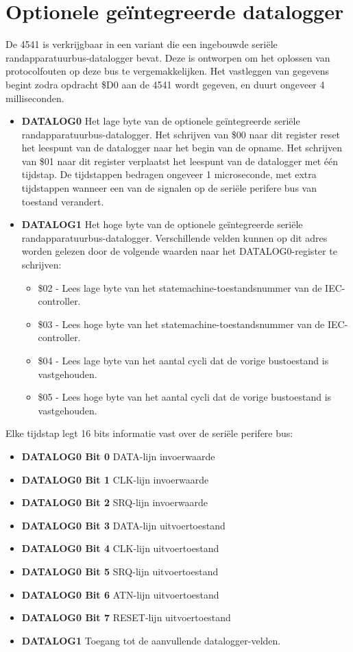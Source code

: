  \section{Optionele geïntegreerde datalogger}

 De 4541 is verkrijgbaar in een variant die een ingebouwde seriële        randapparatuurbus-datalogger bevat. Deze is ontworpen om het oplossen van        protocolfouten op deze bus te vergemakkelijken. Het vastleggen van gegevens begint zodra        opdracht \$D0 aan de 4541 wordt gegeven, en        duurt ongeveer 4 milliseconden.

\begin{itemize}
   \item {\bf DATALOG0} Het lage byte van de optionele geïntegreerde seriële    randapparatuurbus-datalogger. Het schrijven van \$00 naar dit register    reset het leespunt van de datalogger naar het begin van de    opname. Het schrijven van \$01 naar dit register    verplaatst het leespunt van de datalogger met één tijdstap.    De tijdstappen bedragen ongeveer 1 microseconde, met extra        tijdstappen wanneer een van de signalen op de seriële        perifere bus van toestand verandert.    \item {\bf DATALOG1} Het hoge byte van de optionele geïntegreerde seriële      randapparatuurbus-datalogger. Verschillende velden kunnen op dit      adres worden gelezen door de volgende waarden naar het DATALOG0-register te schrijven:
      \begin{itemize}
         \item \$02 - Lees lage byte van het statemachine-toestandsnummer van de IEC-controller.        \item \$03 - Lees hoge byte van het statemachine-toestandsnummer van de IEC-controller.        \item \$04 - Lees lage byte van het aantal cycli dat de vorige bustoestand        is vastgehouden.        \item \$05 - Lees hoge byte van het aantal cycli dat de vorige bustoestand        is vastgehouden.
        \end{itemize}
\end{itemize}

 Elke tijdstap legt 16 bits informatie vast over de seriële        perifere bus:
\begin{itemize}
 \item {\bf DATALOG0 Bit 0} DATA-lijn invoerwaarde\item {\bf DATALOG0 Bit 1} CLK-lijn invoerwaarde\item {\bf DATALOG0 Bit 2} SRQ-lijn invoerwaarde\item {\bf DATALOG0 Bit 3} DATA-lijn uitvoertoestand\item {\bf DATALOG0 Bit 4} CLK-lijn uitvoertoestand\item {\bf DATALOG0 Bit 5} SRQ-lijn uitvoertoestand\item {\bf DATALOG0 Bit 6} ATN-lijn uitvoertoestand\item {\bf DATALOG0 Bit 7} RESET-lijn uitvoertoestand\item {\bf DATALOG1} Toegang tot de aanvullende datalogger-velden.
\end{itemize}


